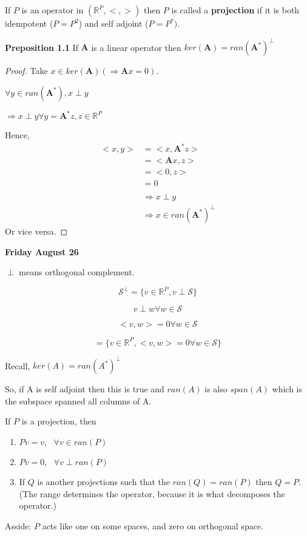 \documentclass[11pt,fleqn]{book} %
\begin{document}
\begin{definition}[Projection]
	If $P$ is an operator in $(\mathbb{R}^{P}, <,>)$ then $P$ is called a \textbf{projection} if it is both idempotent ($P = P^2$) and self adjoint ($P = P^*)$. 
\end{definition}

\textbf{Preposition 1.1} If $\bm{A}$ is a linear operator then $ker(\bm{A}) = ran(\bm{A}^*)^\bot$

\begin{proof}
	Take $x \in ker(\bm{A}) (\Rightarrow \bm{A}x = 0)$. 

	$\forall y \in ran(\bm{A}^*), x \perp y$

	$\Rightarrow x \perp y \forall y = \bm{A}^*z, z \in \mathbb{R}^P$

	Hence, 
	\begin{align*}
		<x,y> &= <x, \bm{A}^*z>\\
			&= <\bm{A}x, z>\\
			&= <0, z>\\
			&= 0\\
			\\
			&\Rightarrow x \perp y\\
			&\Rightarrow x \in ran(\bm{A}^*)^\perp
	\end{align*}
Or vice versa.
\end{proof}

\textbf{Friday August 26}

\begin{remark}
	$\perp$ means orthogonal complement. 

	$$\mathscr{S}^\perp = \{v \in \mathbb{R}^P, v \perp \mathscr{S} \} $$

	$$ v \perp w \forall w \in \mathscr{S} $$

	$$<v,w> = 0 \forall w \in \mathscr{S} $$

	$$ = \{v \in \mathbb{R}^P, <v,w> = 0 \forall w \in \mathscr{S} \} $$
\end{remark}

Recall, 
$ker(A) = ran(A^*)^\perp$

So, if A is self adjoint then this is true and $ran(A) $ is also $span(A)$ which is the subspace spanned all columns of A. 

\begin{theorem}
	If $P$ is a projection, then 

	\begin{enumerate}
		\item $Pv = v,\text{ } \forall v \in ran(P) $
		\item $Pv = 0,\text{ } \forall v \perp ran(P)$ 
		\item If $Q$ is another projections such that the $ran(Q) = ran(P)$ then $Q=P$. (The range determines the operator, because it is what decomposes the operator.)

	\end{enumerate}

	Asside: $P$ acts like one on some spaces, and zero on orthogonal space.

\end{theorem}
\end{document}
